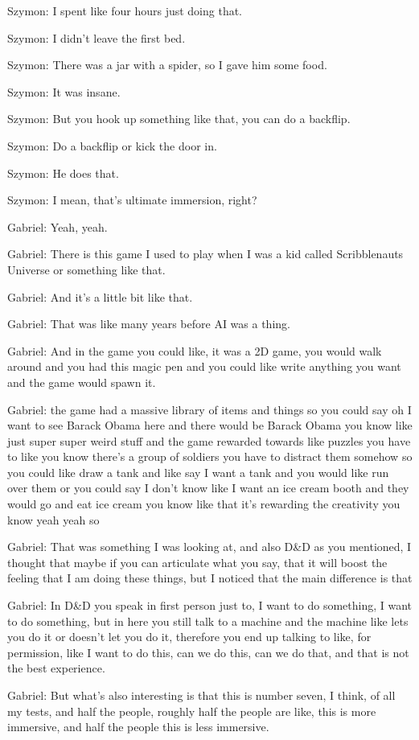 Szymon: I spent like four hours just doing that.

Szymon: I didn't leave the first bed.

Szymon: There was a jar with a spider, so I gave him some food.

Szymon: It was insane.

Szymon: But you hook up something like that, you can do a backflip.

Szymon: Do a backflip or kick the door in.

Szymon: He does that.

Szymon: I mean, that's ultimate immersion, right?

Gabriel: Yeah, yeah.

Gabriel: There is this game I used to play when I was a kid called Scribblenauts Universe or something like that.

Gabriel: And it's a little bit like that.

Gabriel: That was like many years before AI was a thing.

Gabriel: And in the game you could like, it was a 2D game, you would walk around and you had this magic pen and you could like write anything you want and the game would spawn it.

Gabriel: the game had a massive library of items and things so you could say oh I want to see Barack Obama here and there would be Barack Obama you know like just super super weird stuff and the game rewarded towards like puzzles you have to like you know there's a group of soldiers you have to distract them somehow so you could like draw a tank and like say I want a tank and you would like run over them or you could say I don't know like I want an ice cream booth and they would go and eat ice cream you know like that it's rewarding the creativity you know yeah yeah so

Gabriel: That was something I was looking at, and also D&D as you mentioned, I thought that maybe if you can articulate what you say, that it will boost the feeling that I am doing these things, but I noticed that the main difference is that

Gabriel: In D&D you speak in first person just to, I want to do something, I want to do something, but in here you still talk to a machine and the machine like lets you do it or doesn't let you do it, therefore you end up talking to like, for permission, like I want to do this, can we do this, can we do that, and that is not the best experience.

Gabriel: But what's also interesting is that this is number seven, I think, of all my tests, and half the people, roughly half the people are like, this is more immersive, and half the people this is less immersive.

